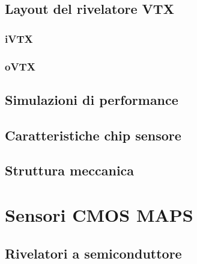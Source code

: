 \documentclass[10pt,a4paper,twoside]{report}
\begin{document}
\section{Layout del rivelatore VTX}

\subsection{iVTX}

\subsection{oVTX}


\section{Simulazioni di performance}


\section{Caratteristiche chip sensore}



\section{Struttura meccanica}



\chapter{Sensori CMOS MAPS}


\section{Rivelatori a semiconduttore}
\end{document}
